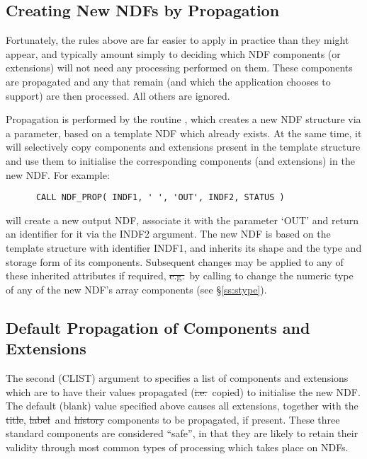 \subsection{\label{ss:prop}Creating New NDFs by Propagation}

Fortunately, the rules above are far easier to apply in practice than they
might appear, and typically amount simply to deciding which NDF components
(or extensions) will not need any processing performed on them.
These components are propagated and any that remain (and which the
application chooses to support) are then processed. 
All others are ignored.

Propagation is performed by the routine , which creates a new NDF
structure via a parameter, based on a template NDF which already exists. 
At the same time, it will selectively copy components and extensions present
in the template structure and use them to initialise the corresponding
components (and extensions) in the new NDF. 
For example:

\small
\begin{verbatim}
      CALL NDF_PROP( INDF1, ' ', 'OUT', INDF2, STATUS )
\end{verbatim}
\normalsize

will create a new output NDF, associate it with the parameter `OUT' and
return an identifier for it via the INDF2 argument. 
The new NDF is based on the template structure with identifier INDF1, and
inherits its shape and the type and storage form of its components.
Subsequent changes may be applied to any of these inherited attributes if
required, \st{e.g.}\ by calling  to change the numeric type of any
of the new NDF's array components (see \S\ref{ss:stype}). 

\subsection{\label{ss:defaultpropagation}Default Propagation of Components and Extensions}

The second (CLIST) argument to  specifies a list of
components and extensions which are to have their values propagated
(\st{i.e.}\ copied) to initialise the new NDF.  
The default (blank) value specified above causes all extensions, together
with the \st{title}, \st{label\/}\ and \st{history\/} components to be
propagated, if present. 
These three standard components are considered ``safe'', in that they are
likely to retain their validity through most common types of processing
which takes place on NDFs. 

